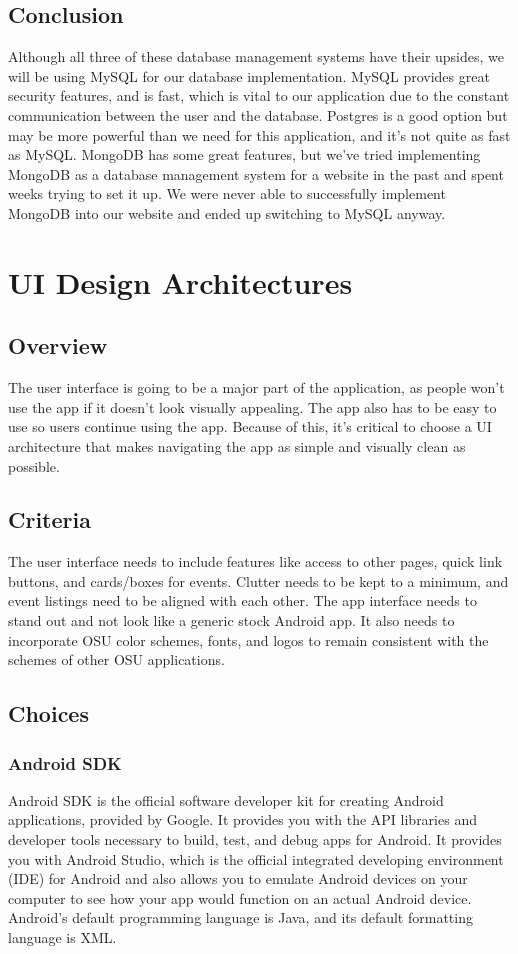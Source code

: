 \documentclass[draftclsnofoot, onecolumn, 10pt, compsoc]{IEEEtran}
\begin{document}
		\subsection{Conclusion}
			Although all three of these database management systems have their upsides, we will be using MySQL for our database implementation. MySQL provides great security features, and is fast, which is vital to our application due to the constant communication between the user and the database. Postgres is a good option but may be more powerful than we need for this application, and it's not quite as fast as MySQL. MongoDB has some great features, but we've tried implementing MongoDB as a database management system for a website in the past and spent weeks trying to set it up. We were never able to successfully implement MongoDB into our website and ended up switching to MySQL anyway.
	
	\section{UI Design Architectures}
		\subsection{Overview}
			The user interface is going to be a major part of the application, as people won't use the app if it doesn't look visually appealing. The app also has to be easy to use so users continue using the app. Because of this, it's critical to choose a UI architecture that makes navigating the app as simple and visually clean as possible.
		\subsection{Criteria}
			The user interface needs to include features like access to other pages, quick link buttons, and cards/boxes for events. Clutter needs to be kept to a minimum, and event listings need to be aligned with each other. The app interface needs to stand out and not look like a generic stock Android app. It also needs to incorporate OSU color schemes, fonts, and logos to remain consistent with the schemes of other OSU applications.
			
		\subsection{Choices}
			\subsubsection{\textbf{Android SDK}}
				Android SDK is the official software developer kit for creating Android applications, provided by Google. It provides you with the API libraries and developer tools necessary to build, test, and debug apps for Android. It provides you with Android Studio, which is the official integrated developing environment (IDE) for Android and also allows you to emulate Android devices on your computer to see how your app would function on an actual Android device. Android's default programming language is Java, and its default formatting language is XML.
				~\cite{AndroidSDK_vs_SemanticUI}			
\end{document}
